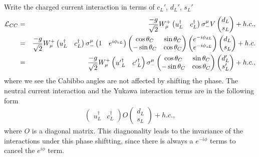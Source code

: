 \documentclass[11pt]{article}
\begin{document}
\section{ }
Write the charged current interaction in terms of $c_L'$, $d_L'$, $s_L'$
\begin{eqnarray}
    {\cal L}_{CC}
    &=&
    \frac{-g}{\sqrt2}  W^+_\mu 
    \begin{pmatrix}
      u_L^\dagger & c_L^\dagger
    \end{pmatrix}
    \sigma_-^\mu V 
    \begin{pmatrix}
      d_L \\s_L
    \end{pmatrix}+ h.c.,\\
    &=&
    \frac{-g}{\sqrt2}  W^+_\mu 
    \begin{pmatrix}
      u_L^\dagger & c_L^\dagger
    \end{pmatrix}
    \sigma_-^\mu 
    \begin{pmatrix}
        1 & e^{i\phi_{cL}}
      \end{pmatrix}
      \begin{pmatrix}
        \cos\theta_C & \sin\theta_C \\
        -\sin\theta_C & \cos\theta_C 
       \end{pmatrix}
       \begin{pmatrix}
        e^{-i \phi_{dL}} \\ e^{-i \phi_{sL}}
       \end{pmatrix} 
    \begin{pmatrix}
      d_L \\s_L
    \end{pmatrix}+ h.c. \\
    &=&
    \frac{-g}{\sqrt2}  W^+_\mu 
    \begin{pmatrix}
      {u'}_L^\dagger & {c'}_L^\dagger
    \end{pmatrix}
    \sigma_-^\mu 
      \begin{pmatrix}
        \cos\theta_C & \sin\theta_C \\
        -\sin\theta_C & \cos\theta_C 
       \end{pmatrix} 
    \begin{pmatrix}
      d'_L \\s'_L
    \end{pmatrix}+ h.c.,
  \end{eqnarray}
where we see the Cabibbo angles are not affected by shifting the phase. The neutral current interaction and the Yukawa interaction terms are in the following form
\begin{eqnarray}
    \begin{pmatrix}
        u_L^\dagger & c_L^\dagger
    \end{pmatrix}
    O
    \begin{pmatrix}
        d_L \\s_L
    \end{pmatrix}+ h.c.,
\end{eqnarray}
where $O$ is a diagonal matrix. This diagnonality leads to the invariance of the interactions under this phase shiftting, since there is always a $e^{-i \phi}$ terms to cancel the $e^{i \phi}$ term.
\end{document}
